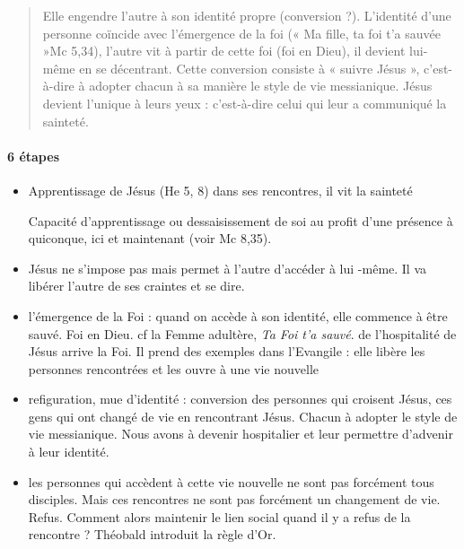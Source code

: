 \begin{quote}
    Elle engendre l’autre à son identité propre (conversion ?). L’identité d’une personne coïncide
avec l’émergence de la foi (« Ma fille, ta foi t’a sauvée »Mc 5,34), l’autre vit à partir de cette
foi (foi en Dieu), il devient lui-même en se décentrant. Cette conversion consiste à « suivre
Jésus », c’est-à-dire à adopter chacun à sa manière le style de vie messianique. Jésus devient
l’unique à leurs yeux : c’est-à-dire celui qui leur a communiqué la sainteté. 
\end{quote}

\paragraph{6 étapes}
\begin{itemize}
    \item Apprentissage de Jésus (He 5, 8) dans ses rencontres, il vit la sainteté
    \begin{Def}[Sainteté]
 Capacité d’apprentissage ou dessaisissement de soi au profit d’une présence à
quiconque, ici et maintenant (voir Mc 8,35).
\end{Def}
\item Jésus ne s'impose pas mais permet à l'autre d'accéder à lui -même. Il va libérer l'autre de ses craintes et se dire. 
\item l'émergence de la Foi : quand on accède à son identité, elle commence à être sauvé. Foi en Dieu. cf la Femme adultère, \textit{Ta Foi t'a sauvé}. de l'hospitalité de Jésus arrive la Foi. Il prend des exemples dans l'Evangile : elle libère les personnes rencontrées et les ouvre à une vie nouvelle
\item refiguration, mue d'identité : conversion des personnes qui croisent Jésus, ces gens qui ont changé de vie en rencontrant Jésus. Chacun à adopter le style de vie messianique. Nous avons à devenir hospitalier et leur permettre d'advenir à leur identité.
\item les personnes qui accèdent à cette vie nouvelle  ne sont pas forcément tous disciples. Mais ces rencontres ne sont pas forcément un changement de vie. Refus. Comment alors maintenir le lien social quand il y a refus de la rencontre ? 
Théobald introduit la règle d'Or.
\end{itemize}
 
